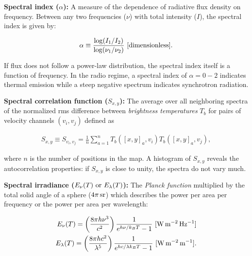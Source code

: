 \documentclass[a4paper,10pt]{article}
\begin{document}
{\noindent}\textbf{Spectral index ($\alpha$):} A measure of the dependence of radiative flux density on frequency. Between any two frequencies ($\nu$) with total intensity ($I$), the spectral index is given by:

\begin{align*}
    \alpha \equiv \frac{\log(I_1/I_2)}{\log(\nu_1/\nu_2)} ~ [{\rm dimensionless}].
\end{align*}

{\noindent}If flux does not follow a power-law distribution, the spectral index itself is a function of frequency. In the radio regime, a spectral index of $\alpha=0-2$ indicates thermal emission while a steep negative spectrum indicates synchrotron radiation.

{\noindent}\textbf{Spectral correlation function ($S_{x,y}$):} The average over all neighboring spectra of the normalized rms difference between \textit{brightness temperatures} $T_b$ for pairs of velocity channels $(v_i,v_j)$ defined as

\begin{align*}
    S_{x,y} \equiv S_{v_i,v_j} = \frac{1}{n}\sum_{a=1}^n T_b([x,y]_a,v_i)T_b([x,y]_a,v_j),
\end{align*}

{\noindent}where $n$ is the number of positions in the map. A histogram of $S_{x,y}$ reveals the autocorrelation properties: if $S_{x,y}$ is close to unity, the spectra do not vary much.

{\noindent}\textbf{Spectral irradiance ($E_\nu(T)~{\rm or}~E_\lambda(T)$):} The \textit{Planck function} multiplied by the total solid angle of a sphere ($4\pi\,{\rm sr}$) which describes the power per area per frequency or the power per area per wavelength:

\begin{align*}
    E_\nu(T) = \left(\frac{8\pi h\nu^3}{c^2}\right) \frac{1}{e^{h\nu/k_BT}-1} ~ [{\rm W\,m^{-2}\,Hz^{-1}}] \\
    E_\lambda(T) = \left(\frac{8\pi hc^2}{\lambda^5}\right) \frac{1}{e^{hc/\lambda k_BT}-1} ~ [{\rm W\,m^{-2}\,m^{-1}}].
\end{align*}
\end{document}

